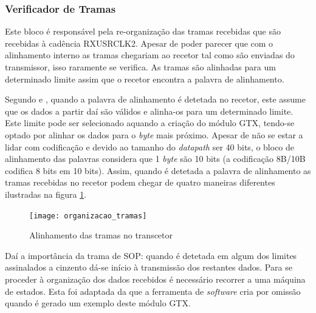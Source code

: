 \documentclass[11pt,a4paper]{article}
\begin{document}
	\subsubsection*{Verificador de Tramas} \label{subsub:serial_frameChecker}
	
	
	Este bloco é responsável pela re-organização das tramas recebidas que são recebidas à cadência RXUSRCLK2. Apesar de poder parecer que com o alinhamento interno as tramas chegariam ao recetor tal como são enviadas do transmissor, isso raramente se verifica. As tramas são alinhadas para um determinado limite assim que o recetor encontra a palavra de alinhamento. %
	
	Segundo \cite{R022} e \cite{R011}, quando a palavra de alinhamento é detetada no recetor, este assume que os dados a partir daí são válidos e alinha-os para um determinado limite. Este limite pode ser selecionado aquando a criação do módulo GTX, tendo-se optado por alinhar os dados para o \textit{byte} mais próximo. Apesar de não se estar a lidar com codificação e devido ao tamanho do \textit{datapath} ser 40 bits, o bloco de alinhamento das palavras considera que 1 \textit{byte} são 10 bits (a codificação 8B/10B codifica 8 bits em 10 bits). Assim, quando é detetada a palavra de alinhamento as tramas recebidas no recetor podem chegar de quatro maneiras diferentes ilustradas na figura \ref{fig:alinhamento_tramas_gtx}.
	
	
	\begin{figure}[h!]
		\begin{center}
			\leavevmode
			\texttt{[image: organizacao\_tramas]}
			\caption[Alinhamento das tramas no transcetor]{Alinhamento das tramas no transcetor}
			\label{fig:alinhamento_tramas_gtx}
		\end{center}
	\end{figure}
	
	Daí a importância da trama de SOP: quando é detetada em algum dos limites assinalados a cinzento dá-se início à transmissão dos restantes dados. Para se proceder à organização dos dados recebidos é necessário recorrer a uma máquina de estados. Esta foi adaptada da que a ferramenta de \textit{software} cria por omissão quando é gerado um exemplo deste módulo GTX.
	
\end{document}
